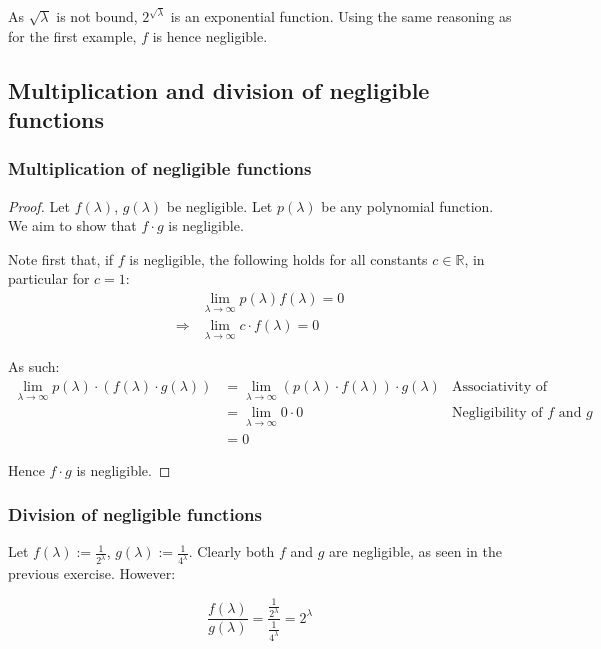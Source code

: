 \documentclass[a4paper]{scrreprt}
\begin{document}
As $\sqrt{\lambda}$ is not bound, $2^{\sqrt{\lambda}}$ is an exponential
function. Using the same reasoning as for the first example, $f$ is hence
negligible.

\subsection{Multiplication and division of negligible functions}

\subsubsection{Multiplication of negligible functions}

\begin{proof}
	Let $f(\lambda)$, $g(\lambda)$ be negligible. Let $p(\lambda)$ be any
	polynomial function. We aim to show that $f \cdot g$ is negligible.

	Note first that, if $f$ is negligible, the following holds for all
	constants $c \in \mathbb{R}$, in particular for $c = 1$:
	\begin{align*}
		& \lim_{\lambda \rightarrow \infty} p(\lambda) f(\lambda) = 0 \\
		\Rightarrow & \lim_{\lambda \rightarrow \infty} c \cdot f(\lambda) = 0
	\end{align*}

	As such:
	\begin{align*}
		\lim_{\lambda \rightarrow \infty} p(\lambda) \cdot (f(\lambda) \cdot g(\lambda)) 
		  & = \lim_{\lambda \rightarrow \infty} (p(\lambda) \cdot f(\lambda)) \cdot g(\lambda) & \text{Associativity of multiplication} \\
		  & = \lim_{\lambda \rightarrow \infty} 0 \cdot 0 & \text{Negligibility of $f$ and $g$} \\
		  & = 0
	\end{align*}

	Hence $f \cdot g$ is negligible.
\end{proof}

\subsubsection{Division of negligible functions}

Let $f(\lambda) := \frac{1}{2^\lambda}$, $g(\lambda) := \frac{1}{4^\lambda}$.
Clearly both $f$ and $g$ are negligible, as seen in the previous exercise.
However:

\[
	\frac{f(\lambda)}{g(\lambda)} = \frac{\frac{1}{2^\lambda}}{\frac{1}{4^\lambda}} = 2^\lambda
\]
\end{document}
